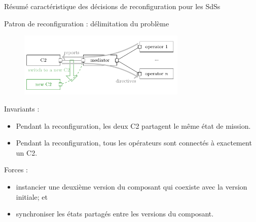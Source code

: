 \begin{frame}{Résumé caractéristique des décisions de reconfiguration
pour les SdSs}
\begin{table}[]
\centering
{}
\end{table}
\end{frame}


\begin{frame}{Patron de reconfiguration : délimitation du problème}
\begin{figure}
\includegraphics[width=8cm]{imgs/dc_archi-C2}
\end{figure}

Invariants :
\begin{itemize}
\item Pendant la
reconfiguration, les deux C2 partagent le même état de mission.
\item Pendant la
reconfiguration, tous les opérateurs sont connectés à exactement un
C2. 
\end{itemize}

Forces :
\begin{itemize}
\item instancier une deuxième version du composant qui coexiste avec
la version initiale; et
\item synchroniser les états partagés entre les versions du
composant.
\end{itemize}

\end{frame}

